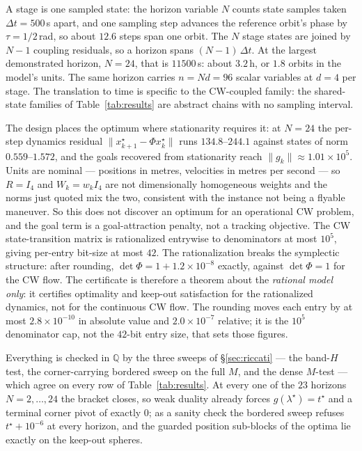 \documentclass[11pt]{article}
\theoremstyle{definition}
\theoremstyle{remark}
\newcommand{\Q}{\mathbb{Q}}
\renewcommand{\_}{\ifdim\fontdimen3\font=0pt\relax\char`\_\else\textunderscore\fi\hspace{0pt}}
\begin{document}
A stage is one sampled state: the horizon variable $N$ counts state samples
taken $\Delta t=500$\,s apart, and one sampling step advances the reference
orbit's phase by $\tau=1/2$\,rad, so about $12.6$ steps span one orbit. The
$N$ stage states are joined by $N-1$ coupling residuals, so a horizon spans
$(N-1)\,\Delta t$. At the largest demonstrated horizon, $N=24$, that is
$11500$\,s: about $3.2$\,h, or $1.8$ orbits in the model's units. The same
horizon carries $n=Nd=96$ scalar variables at $d=4$ per stage. The translation to
time is specific to the CW-coupled family: the shared-state families of
Table~\ref{tab:results} are abstract chains with no sampling interval.

The design places the optimum where stationarity requires it: at $N{=}24$ the
per-step dynamics residual $\lVert x^\star_{k+1}-\Phi x^\star_k\rVert$ runs
$134.8$--$244.1$ against states of norm $0.559$--$1.572$, and the goals
recovered from stationarity reach $\lVert g_k\rVert\approx1.01\times10^{5}$.
Units are nominal --- positions in metres,
velocities in metres per second --- so $R=I_4$ and $W_k=w_kI_4$ are not
dimensionally homogeneous weights and the norms just quoted mix the two,
consistent with the instance not being a flyable maneuver. So this does not
discover an optimum for an operational CW problem, and the goal term is a
goal-attraction penalty, not a tracking objective. The CW state-transition
matrix is rationalized entrywise to denominators at most $10^5$, giving
per-entry bit-size at most $42$. The rationalization breaks the symplectic
structure: after rounding, $\det\Phi=1+1.2\times10^{-8}$ exactly, against
$\det\Phi=1$ for the CW flow. The certificate is therefore a theorem about
the \emph{rational model only}: it certifies optimality and keep-out
satisfaction for the rationalized dynamics, not for the continuous CW flow.
The rounding moves each entry by at most $2.8\times10^{-10}$ in absolute
value and $2.0\times10^{-7}$ relative; it is the $10^5$ denominator cap, not
the $42$-bit entry size, that sets those figures.

Everything is checked in $\Q$ by the three sweeps of \S\ref{sec:riccati} ---
the band-$H$ test, the corner-carrying bordered sweep on the full $M$, and the
dense $M$-test --- which agree on every row of Table~\ref{tab:results}. At
every one of the $23$ horizons $N=2,\dots,24$ the bracket closes, so weak
duality already forces $g(\lambda^\star)=t^\star$ and a terminal corner pivot
of exactly $0$; as a sanity check the bordered sweep refuses $t^\star+10^{-6}$
at every horizon, and the guarded position sub-blocks of the optima lie
exactly on the keep-out spheres.
\end{document}
